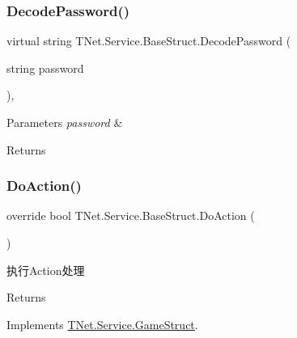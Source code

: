 \subsubsection{\texorpdfstring{Decode\+Password()}{DecodePassword()}}
{\footnotesize\ttfamily virtual string T\+Net.\+Service.\+Base\+Struct.\+Decode\+Password (\begin{DoxyParamCaption}\item[{string}]{password }\end{DoxyParamCaption})\hspace{0.3cm}{\ttfamily [protected]}, {\ttfamily [virtual]}}






\begin{DoxyParams}{Parameters}
{\em password} & \\
\hline
\end{DoxyParams}
\begin{DoxyReturn}{Returns}

\end{DoxyReturn}
\mbox{\label{class_t_net_1_1_service_1_1_base_struct_ad55cbb354a9de58eb1c2d0608a7e21f2}} 
\subsubsection{\texorpdfstring{Do\+Action()}{DoAction()}}
{\footnotesize\ttfamily override bool T\+Net.\+Service.\+Base\+Struct.\+Do\+Action (\begin{DoxyParamCaption}{ }\end{DoxyParamCaption})\hspace{0.3cm}{\ttfamily [virtual]}}



执行\+Action处理 

\begin{DoxyReturn}{Returns}

\end{DoxyReturn}


Implements \mbox{\hyperlink{class_t_net_1_1_service_1_1_game_struct_a7a4391eb55bba0a76637b1d58e6fdea9}{T\+Net.\+Service.\+Game\+Struct}}.

\mbox{\label{class_t_net_1_1_service_1_1_base_struct_a5f4612defb16558fdaa7c0adaa8555d1}} 
